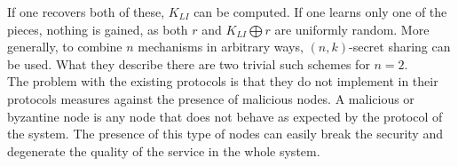   If one recovers both of these, $K_{LI}$ can be computed. If one learns only one
 of the pieces, nothing is gained, as both $r$ and $K_{LI} \bigoplus r$ are
 uniformly random. More generally, to combine $n$ mechanisms
  in arbitrary ways, $(n, k)$-secret sharing can be used. What they
 describe there are two trivial such schemes for $n = 2$.\\




The problem with the existing protocols is that they do not implement in their
protocols measures against the presence of malicious nodes.
A malicious or byzantine node is any node that does
not behave as expected by the protocol of the system. The presence of this type
of nodes can easily break the security and degenerate the quality of the
service in the whole system.
